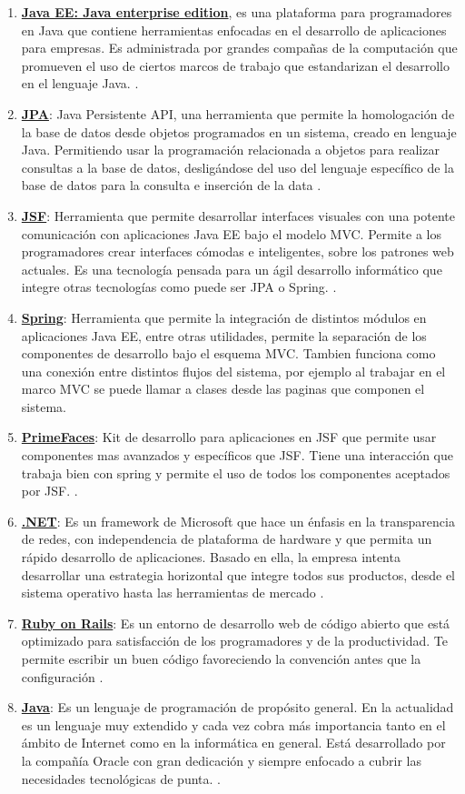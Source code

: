 \documentclass[a4paper,12pt,openany,oneside]{book}
\begin{document}
\begin{enumerate}
	\item \textbf{\underline{Java EE: Java enterprise edition}}, es una plataforma para programadores en Java que contiene herramientas enfocadas en el desarrollo de aplicaciones para empresas. Es administrada por grandes compañas de la computación que promueven el uso de ciertos marcos de trabajo que estandarizan el desarrollo en el lenguaje Java. \cite{data14}.
	\item \textbf{\underline{JPA}}: Java Persistente API, una herramienta que permite la homologación de la base de datos desde objetos programados en un sistema, creado en lenguaje Java. Permitiendo usar la programación relacionada a objetos para realizar consultas a la base de datos, desligándose del uso del lenguaje específico de la base de datos para la consulta e inserción de la data \cite{data13}.
	\item \textbf{\underline{JSF}}: Herramienta que permite desarrollar interfaces visuales con una potente comunicación con aplicaciones Java EE bajo el modelo MVC. Permite a los programadores crear interfaces cómodas e inteligentes, sobre los patrones web actuales. Es una tecnología pensada para un ágil desarrollo informático que integre otras tecnologías como puede ser JPA o Spring. \cite{data16}.
	\item \textbf{\underline{Spring}}: Herramienta que permite la integración de distintos módulos en aplicaciones Java EE, entre otras utilidades, permite la separación de los componentes de desarrollo bajo el esquema MVC. Tambien funciona como una conexión entre distintos flujos del sistema, por ejemplo al trabajar en el marco MVC se puede llamar a clases desde las paginas que componen el sistema\cite{data15}.
	\item \textbf{\underline{PrimeFaces}}: Kit de desarrollo para aplicaciones en JSF que permite usar componentes mas avanzados y específicos que JSF. Tiene una interacción que trabaja bien con spring y permite el uso de todos los componentes aceptados por JSF. \cite{data17}.
	\item \textbf{\underline{.NET}}: Es un framework de Microsoft que hace un énfasis en la transparencia de redes, con independencia de plataforma de hardware y que permita un rápido desarrollo de aplicaciones. Basado en ella, la empresa intenta desarrollar una estrategia horizontal que integre todos sus productos, desde el sistema operativo hasta las herramientas de mercado \cite{data8}.
	\item \textbf{\underline{Ruby on Rails}}: Es un entorno de desarrollo web de código abierto que está optimizado para satisfacción de los programadores y de la productividad. Te permite escribir un buen código favoreciendo la convención antes que la configuración \cite{data9}.
	\item \textbf{\underline{Java}}: Es un lenguaje de programación de propósito general. En la actualidad es un lenguaje muy extendido y cada vez cobra más importancia tanto en el ámbito de Internet como en la informática en general. Está desarrollado por la compañía Oracle con gran dedicación y siempre enfocado a cubrir las necesidades tecnológicas de punta. \cite{data10}.
\end{enumerate}
\end{document}

